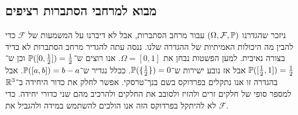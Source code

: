 \subsection{מבוא למרחבי הסתברות רציפים}
ניזכר שהגדרנו $(\Omega, \mathcal{F}, \mathbb{P})$ עבור מרחב הסתברות, אבל לא דיברנו על המשמעות של $\mathcal{F}$ כדי להבין מה היכולות האמיתיות של ההגדרה שלנו.
ננסה עתה להגדיר מרחב הסתברות לא בדיד בצורה נאיבית. למען הפשטות נבחן את $\Omega = [0, 1]$.
אנו רוצים ש־$\mathbb{P}([0, \frac{1}{2}]) = \frac{1}{2}$ וכן ש־$\mathbb{P}([\frac{1}{2}, 1]) = \frac{1}{2}$ אבל אז נובע ישירות ש־$\mathbb{P}(\{\frac{1}{2}\}) = 0$.
ככלל נגדיר ש־$\mathbb{P}([a, b]) = b - a$.
אבל בהגדרה זו אנו נתקלים בפרדוקס בשם בנך־טרסקי.
אפשר לחלק את כדור היחידה ב־$\mathbb{R}^3$ למספר סופי של חלקים זרים ולהזיז ולסובב את החלקים ולהרכיב מהם שני כדורי יחידה.
כדי לא להיתקל בפרדוקס הזה אנו הולכים להשתמש במידה ולהגביל את $\mathcal{F}$.

\listoftheorems[title=הגדרות ומשפטים,ignoreall,show={theorem,definition},swapnumber,onlynamed={proposition}]

